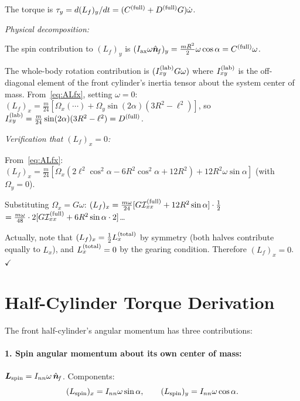 \documentclass[11pt]{article}
\newcommand{\vect}[1]{\bm{#1}}
\newcommand{\uv}[1]{\hat{\bm{#1}}}
\newcommand{\nf}{\uv{n}_{\!f}}
\begin{document}
The torque is $\tau_y=d(L_f)_y/dt=(C^{(\rm full)}+D^{(\rm full)}G)\dot\omega$.

\emph{Physical decomposition:}

The spin contribution to $(L_f)_y$ is
$(I_{\rm ax}\omega\nf)_y=\frac{mR^2}{2}\omega\cos\alpha=C^{(\rm full)}\omega$.

The whole-body rotation contribution is
$(I_{xy}^{(\rm lab)}G\omega)$ where $I_{xy}^{(\rm lab)}$ is the
off-diagonal element of the front cylinder's inertia tensor about
the system center of mass.  From~\eqref{eq:ALfx}, setting
$\omega=0$: $(L_f)_x=\frac{m}{24}[\Omega_x(\cdots)
+\Omega_y\sin(2\alpha)(3R^2-\ell^2)]$, so $I_{xy}^{(\rm lab)}
=\frac{m}{24}\sin(2\alpha)(3R^2-\ell^2)=D^{(\rm full)}$.

\emph{Verification that $(L_f)_x=0$:}

From~\eqref{eq:ALfx}: $(L_f)_x=\frac{m}{24}[\Omega_x(2\ell^2\cos^2\!\alpha
-6R^2\cos^2\!\alpha+12R^2)+12R^2\omega\sin\alpha]$ (with $\Omega_y=0$).

Substituting $\Omega_x=G\omega$:
$(L_f)_x=\frac{m\omega}{24}[G\mathcal{I}_{xx}^{(\rm full)}
+12R^2\sin\alpha]\cdot\frac{1}{2}$
$=\frac{m\omega}{48}\cdot2[G\mathcal{I}_{xx}^{(\rm full)}
+6R^2\sin\alpha\cdot2]$\ldots

Actually, note that $(L_f)_x = \frac{1}{2}L_x^{(\rm total)}$ by
symmetry (both halves contribute equally to $L_x$), and
$L_x^{(\rm total)}=0$ by the gearing condition.  Therefore
$(L_f)_x=0$.~$\checkmark$

\section{Half-Cylinder Torque Derivation}
\label{app:torque_half}

The front half-cylinder's angular momentum has three contributions:

\paragraph{1. Spin angular momentum about its own center of mass:}
$\vect{L}_{\rm spin}=I_{nn}\omega\,\nf$.  Components:
\begin{equation}
(L_{\rm spin})_x = I_{nn}\omega\sin\alpha,\qquad
(L_{\rm spin})_y = I_{nn}\omega\cos\alpha.
\end{equation}
\end{document}
